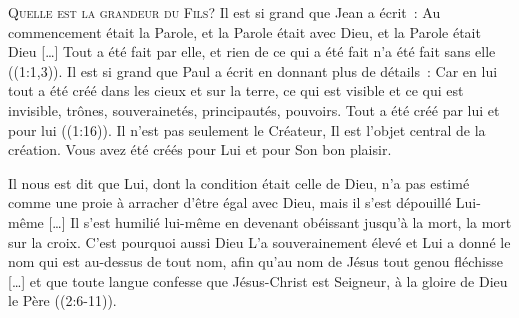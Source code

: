 
\lettrine{Q}{uelle est la grandeur du Fils?}
 Il est si grand que Jean a écrit~: 
 \og Au commencement était la Parole, et la Parole était avec Dieu,
 et la Parole était Dieu [\dots{}] Tout a été fait par elle,
 et rien de ce qui a été fait n'a été fait sans elle \fg{}
 ((1:1,3)). Il est si grand que Paul a écrit en donnant
 plus de détails~: 
 \og Car en lui tout a été créé dans les cieux et sur la terre,
 ce qui est visible et ce qui est invisible, trônes, souverainetés,
 principautés, pouvoirs. Tout a été créé par lui et pour lui \fg{}
 ((1:16)). Il n'est pas seulement le Créateur,
 Il est l'objet central de la création.
 Vous avez été créés pour Lui et pour Son bon plaisir.

Il nous est dit que \og Lui, dont la condition était celle de Dieu,
 n'a pas estimé comme une proie à arracher d'être égal avec Dieu,
 mais il s'est dépouillé Lui-même [\dots{}] Il s'est humilié lui-même
 en devenant obéissant jusqu'à la mort, la mort sur la croix.
 C'est pourquoi aussi Dieu L'a souverainement élevé et Lui a donné le nom
 qui est au-dessus de tout nom, afin qu'au nom de Jésus tout genou
 fléchisse [\dots{}] et que toute langue confesse que Jésus-Christ
 est Seigneur, à la gloire de Dieu le Père \fg{} ((2:6-11)).


\dvrule






